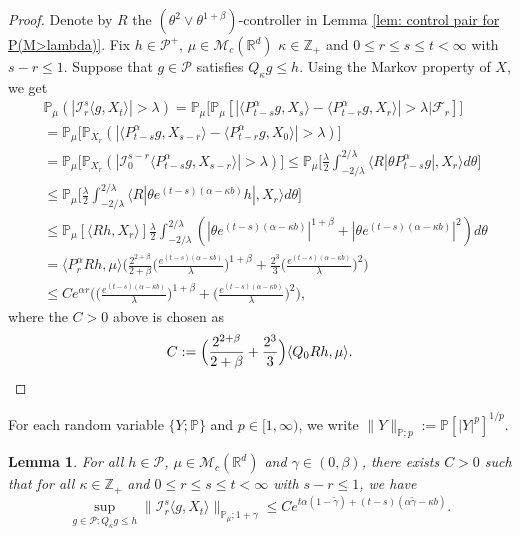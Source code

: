 \documentclass[12pt,a4paper]{amsart}
\theoremstyle{plain}
\newtheorem{lem}[thm]{Lemma}
\theoremstyle{definition}
\numberwithin{equation}{section}
\begin{document}
\begin{proof}
  Denote by $R$ the $(\theta^2\vee\theta^{1+\beta})$-controller in Lemma \ref{lem: control pair for P(M>lambda)}.
  Fix $h \in \mathcal P^+$, $\mu \in \mathcal M_c(\mathbb R^d)$ $\kappa \in \mathbb Z_+ $ and $0\leq r\leq s\leq t < \infty$ with $s-r \leq 1$.
  Suppose that $g\in \mathcal P$ satisfies $Q_\kappa g \leq h$.
  Using the Markov property of $X$, we get
\begin{align}
  & \mathbb P_{\mu}(|\mathcal I_r^s\langle g, X_t\rangle|>\lambda)
    = \mathbb P_\mu \Big[\mathbb P_\mu [|\langle P_{t-s}^\alpha g, X_{s}\rangle - \langle P_{t-r}^\alpha g, X_{r}\rangle|> \lambda | \mathscr F_r ]\Big] \\
  & = \mathbb P_\mu \big[\mathbb P_{X_r}(|\langle P_{t-s}^\alpha g, X_{s-r}\rangle - \langle P_{t-r}^\alpha g, X_{0}\rangle|> \lambda)\big] \\
  & = \mathbb P_\mu \big[\mathbb P_{X_r}(|\mathcal I_0^{s-r}\langle P_{t-s}^\alpha g, X_{s-r}\rangle |> \lambda)\big]
  \leq \mathbb P_\mu \Big[ \frac{\lambda}{2}\int_{-2/\lambda}^{2/\lambda}\langle R|\theta P^\alpha_{t-s}g|,X_r\rangle d\theta \Big] \\
  & \leq \mathbb P_\mu \Big[ \frac{\lambda}{2}\int_{-2/\lambda}^{2/\lambda}\langle R|\theta e^{(t-s)(\alpha- \kappa b)}h|,X_r\rangle d\theta \Big] \\
  & \leq \mathbb P_\mu [ \langle Rh,X_r\rangle ] \frac{\lambda}{2}\int_{-2/\lambda}^{2/\lambda}(|\theta e^{(t-s)(\alpha- \kappa b)}|^{1+\beta} + |\theta e^{(t-s)(\alpha- \kappa b)}|^{2})d\theta
  \\ & =  \langle P_r^\alpha Rh,\mu\rangle \Big(  \frac{2^{2+\beta}}{2+\beta}\Big(\frac{e^{(t-s)(\alpha- \kappa b)}}{\lambda}\Big)^{1+\beta} + \frac{2^{3}}{3}\Big(\frac{e^{(t-s)(\alpha- \kappa b)}}{\lambda}\Big)^2\Big)
  \\ & \leq C e^{\alpha r} \Big(\Big( \frac{e^{(t-s)(\alpha - \kappa b)}}{\lambda}\Big)^{1+\beta} + \Big( \frac{e^{(t-s)(\alpha - \kappa b)}}{\lambda}\Big)^{2} \Big),
\end{align}
where the $C>0$ above is chosen as
\[
  C := \Big(\frac{2^{2+\beta}}{2+\beta} + \frac{2^{3}}{3} \Big)\langle Q_0Rh, \mu\rangle.
  \qedhere
\]
\end{proof}


For each random variable $\{Y; \mathbb P\}$ and $p \in [1,\infty)$, we write $ \|Y\|_{\mathbb P;p} := \mathbb P[|Y|^p]^{1/p}. $
\begin{lem}
  \label{lem: control of mgtrs}
  For all $h \in \mathcal P$, $\mu \in \mathcal M_c(\mathbb R^d)$ and $\gamma\in (0, \beta)$, there exists $C > 0$ such that for all $\kappa \in \mathbb Z_+$ and $0\leq r \leq s\leq t<\infty$ with $s-r \leq 1$, we have
  \[
    \sup_{g \in \mathcal P: Q_\kappa g \leq h} \|\mathcal I_r^s\langle g, X_t\rangle \|_{\mathbb P_\mu;1+\gamma}
    \leq C e^{t\alpha (1- \tilde \gamma)+(t-s) (\alpha \tilde \gamma - \kappa b)}.
  \]
\end{lem}
\end{document}
